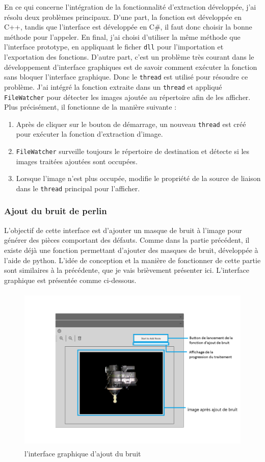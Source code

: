 En ce qui concerne l'intégration de la fonctionnalité d'extraction développée, j'ai résolu deux problèmes principaux. D'une part, la fonction est développée en C++, tandis que l'interface est développée en C\#, il faut donc choisir la bonne méthode pour l'appeler. En final, j'ai choisi d'utiliser la même méthode que l'interface prototype, en appliquant le ficher \texttt{dll} pour l'importation et l'exportation des fonctions. D'autre part, c'est un problème très courant dans le développement d'interface graphiques est de savoir comment exécuter la fonction sans bloquer l'interface graphique. Donc le \texttt{thread} est utilisé pour résoudre ce problème. J'ai intégré la fonction extraite dans un \texttt{thread} et appliqué \texttt{FileWatcher} pour détecter les images ajoutée au répertoire afin de les afficher. Plus précisément, il fonctionne de la manière suivante : 
\begin{enumerate}
    \item Après de cliquer sur le bouton de démarrage, un nouveau \texttt{thread} est créé pour exécuter la fonction d'extraction d'image. 
    \item \texttt{FileWatcher} surveille toujours le répertoire de destination et détecte si les images traitées ajoutées sont occupées.
    \item Lorsque l'image n'est plus occupée, modifie le propriété de la source de liaison dans le \texttt{thread} principal pour l'afficher.
\end{enumerate}

\subsubsection{Ajout du bruit de perlin}
L'objectif de cette interface est d'ajouter un masque de bruit à l'image pour générer des pièces comportant des défauts. Comme dans la partie précédent, il existe déjà une fonction permettant d'ajouter des masques de bruit, développée à l'aide de python. L'idée de conception et la manière de fonctionner de cette partie sont similaires à la précédente, que je vais brièvement présenter ici. L'interface graphique est présentée comme ci-dessous. 
\begin{figure}[H]
    \centering
    \includegraphics[height=8cm]{ressources/images/perlin_noise.png}
    \caption{l'interface graphique d'ajout du bruit}
\end{figure}

